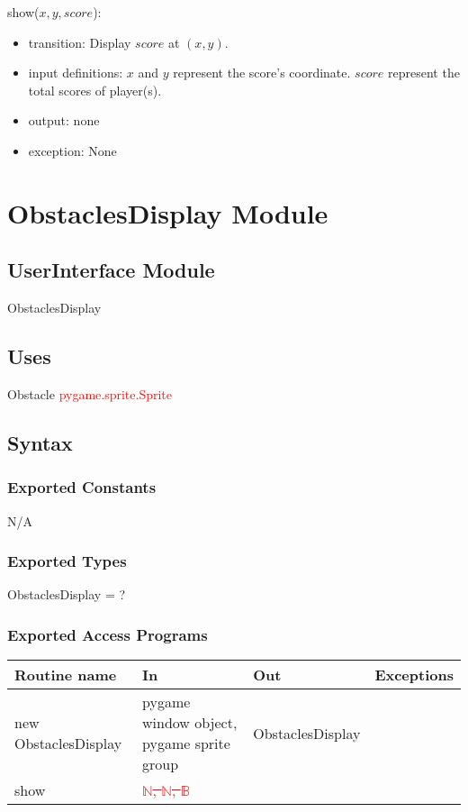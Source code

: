 \documentclass[12pt]{article}
\begin{document}
\noindent show($x, y, score$):
\begin{itemize}
    \item transition: Display $score$ at $(x, y)$.
    \item input definitions: $x$ and $y$ represent the score's coordinate. $score$ represent the total scores of player(s).
    \item output: none
    \item exception: None
\end{itemize}
\newpage

\section{ObstaclesDisplay Module}

\subsection*{UserInterface Module}
ObstaclesDisplay

\subsection*{Uses}
Obstacle \textcolor{red}{pygame.sprite.Sprite}

\subsection*{Syntax}
\subsubsection*{Exported Constants}
N/A
\subsubsection*{Exported Types}
ObstaclesDisplay = ?

\subsubsection*{Exported Access Programs}
\begin{tabular}{| l | l | l | l |}
\hline
\textbf{Routine name} & \textbf{In} & \textbf{Out} & \textbf{Exceptions}\\
\hline
new ObstaclesDisplay       &pygame window object, pygame sprite group&     ObstaclesDisplay        &           \\
\hline
show       &	\textcolor{red}{\st{$\mathbb{N}$, $\mathbb{N}$, $\mathbb{B}$ }}    &           &          \\
\hline
\end{tabular}
\end{document}
